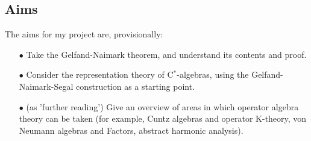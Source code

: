\documentclass[12pt,a4paper]{amsart}
\theoremstyle{plain}
\theoremstyle{defn}
\begin{document}
\subsection{Aims}
The aims for my project are, provisionally:
\begin{enumerate}

	\item[$\bullet$] Take the Gelfand-Naimark theorem, and understand its contents and proof.
	\item[$\bullet$] Consider the representation theory of C$^\ast$-algebras, using the Gelfand-Naimark-Segal construction as a starting point.
	\item[$\bullet$] (as 'further reading') Give an overview of areas in which operator algebra theory can be taken (for example, Cuntz algebras and operator K-theory, von Neumann algebras and Factors, abstract harmonic analysis).
\end{enumerate}

\begin{thebibliography}{00}
	
	
	
\end{thebibliography}
\end{document}
